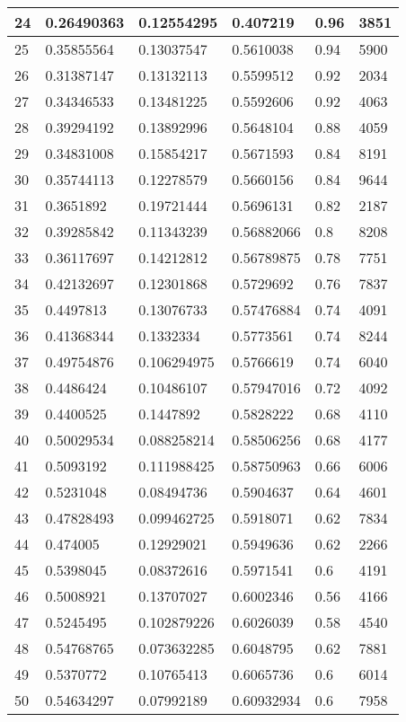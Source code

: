 \begin{longtable}{|l|l|l|l|l|l|}
24 & 0.26490363 & 0.12554295 & 0.407219 & 0.96 & 3851 \\ \hline 
25 & 0.35855564 & 0.13037547 & 0.5610038 & 0.94 & 5900 \\ \hline 
26 & 0.31387147 & 0.13132113 & 0.5599512 & 0.92 & 2034 \\ \hline 
27 & 0.34346533 & 0.13481225 & 0.5592606 & 0.92 & 4063 \\ \hline 
28 & 0.39294192 & 0.13892996 & 0.5648104 & 0.88 & 4059 \\ \hline 
29 & 0.34831008 & 0.15854217 & 0.5671593 & 0.84 & 8191 \\ \hline 
30 & 0.35744113 & 0.12278579 & 0.5660156 & 0.84 & 9644 \\ \hline 
31 & 0.3651892 & 0.19721444 & 0.5696131 & 0.82 & 2187 \\ \hline 
32 & 0.39285842 & 0.11343239 & 0.56882066 & 0.8 & 8208 \\ \hline 
33 & 0.36117697 & 0.14212812 & 0.56789875 & 0.78 & 7751 \\ \hline 
34 & 0.42132697 & 0.12301868 & 0.5729692 & 0.76 & 7837 \\ \hline 
35 & 0.4497813 & 0.13076733 & 0.57476884 & 0.74 & 4091 \\ \hline 
36 & 0.41368344 & 0.1332334 & 0.5773561 & 0.74 & 8244 \\ \hline 
37 & 0.49754876 & 0.106294975 & 0.5766619 & 0.74 & 6040 \\ \hline 
38 & 0.4486424 & 0.10486107 & 0.57947016 & 0.72 & 4092 \\ \hline 
39 & 0.4400525 & 0.1447892 & 0.5828222 & 0.68 & 4110 \\ \hline 
40 & 0.50029534 & 0.088258214 & 0.58506256 & 0.68 & 4177 \\ \hline 
41 & 0.5093192 & 0.111988425 & 0.58750963 & 0.66 & 6006 \\ \hline 
42 & 0.5231048 & 0.08494736 & 0.5904637 & 0.64 & 4601 \\ \hline 
43 & 0.47828493 & 0.099462725 & 0.5918071 & 0.62 & 7834 \\ \hline 
44 & 0.474005 & 0.12929021 & 0.5949636 & 0.62 & 2266 \\ \hline 
45 & 0.5398045 & 0.08372616 & 0.5971541 & 0.6 & 4191 \\ \hline 
46 & 0.5008921 & 0.13707027 & 0.6002346 & 0.56 & 4166 \\ \hline 
47 & 0.5245495 & 0.102879226 & 0.6026039 & 0.58 & 4540 \\ \hline 
48 & 0.54768765 & 0.073632285 & 0.6048795 & 0.62 & 7881 \\ \hline 
49 & 0.5370772 & 0.10765413 & 0.6065736 & 0.6 & 6014 \\ \hline 
50 & 0.54634297 & 0.07992189 & 0.60932934 & 0.6 & 7958 \\ \hline 
\end{longtable}